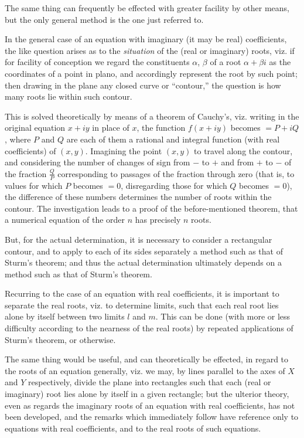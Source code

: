 \documentclass[12pt,a4paper]{article}
\theoremstyle{plain}
\theoremstyle{definition}
\theoremstyle{remark}
\begin{document}
The same thing can frequently be effected with greater facility by other means, but the only general method is the one just referred to.

In the general case of an equation with imaginary (it may be real) coefficients, the like question arises as to the \textit{situation} of the (real or imaginary) roots, viz. if for facility of conception we regard the constituents $\alpha$, $\beta$ of a root $\alpha + \beta i$ as the coordinates of a point in plano, and accordingly represent the root by such point; then drawing in the plane any closed curve or ``contour,'' the question is how many roots lie within such contour.

This is solved theoretically by means of a theorem of Cauchy's, viz. writing in the original equation $x + iy$ in place of $x$, the function $f(x+iy)$ becomes $= P + iQ$, where $P$ and $Q$ are each of them a rational and integral function (with real coefficients) of $(x, y)$. Imagining the point $(x, y)$ to travel along the contour, and considering the number of changes of sign from $-$ to $+$ and from $+$ to $-$ of the fraction $\frac{Q}{P}$ corresponding to passages of the fraction through zero (that is, to values for which $P$ becomes $=0$, disregarding those for which $Q$ becomes $=0$), the difference of these numbers determines the number of roots within the contour. The investigation leads to a proof of the before-mentioned theorem, that a numerical equation of the order $n$ has precisely $n$ roots.

But, for the actual determination, it is necessary to consider a rectangular contour, and to apply to each of its sides separately a method such as that of Sturm's theorem; and thus the actual determination ultimately depends on a method such as that of Sturm's theorem.

Recurring to the case of an equation with real coefficients, it is important to separate the real roots, viz. to determine limits, such that each real root lies alone by itself between two limits $l$ and $m$. This can be done (with more or less difficulty according to the nearness of the real roots) by repeated applications of Sturm's theorem, or otherwise.

The same thing would be useful, and can theoretically be effected, in regard to the roots of an equation generally, viz. we may, by lines parallel to the axes of $X$ and $Y$ respectively, divide the plane into rectangles such that each (real or imaginary) root lies alone by itself in a given rectangle; but the ulterior theory, even as regards the imaginary roots of an equation with real coefficients, has not been developed, and the remarks which immediately follow have reference only to equations with real coefficients, and to the real roots of such equations.
\end{document}
